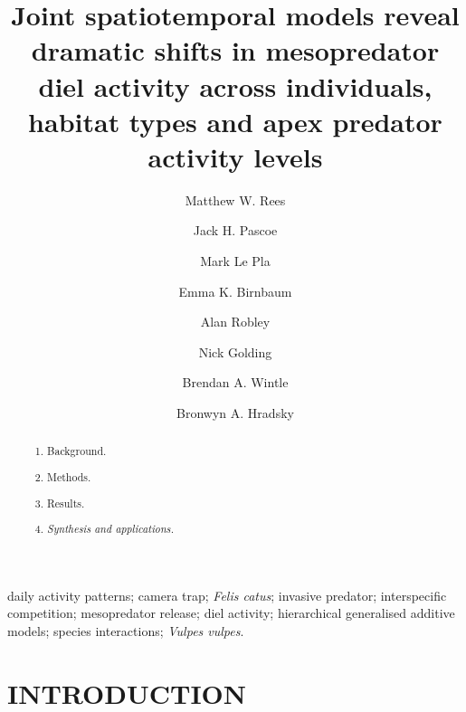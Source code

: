 \documentclass[]{elsarticle} %
\begin{document}
\begin{frontmatter}

  \title{Joint spatiotemporal models reveal dramatic shifts in mesopredator diel activity across individuals, habitat types and apex predator activity levels}
    \author[UOM]{Matthew W. Rees}
    \author[CEC]{Jack H. Pascoe}
  
    \author[CEC]{Mark Le Pla}
  
    \author[CEC]{Emma K. Birnbaum}
  
    \author[ARI]{Alan Robley}
  
    \author[CU,TKI]{Nick Golding}
  
    \author[UOM]{Brendan A. Wintle}
  
    \author[UOM]{Bronwyn A. Hradsky}
  
      \address[UOM]{Quantitative \& Applied Ecology Group, School of Ecosystem and Forest Science, The University of Melbourne, Parkville, VIC, Australia}
    \address[CEC]{Conservation Ecology Centre, Otway Lighthouse Rd, Cape Otway, VIC, Australia}
    \address[ARI]{Department of Environment, Land, Water and Planning, Arthur Rylah Institute for Environmental Research, Heidelberg, Australia}
    \address[CU]{Curtin University, Bentley, WA, Australia}
    \address[TKI]{Telethon Kids Institute, Perth Children's Hospital, Nedlands, WA, Australia}
  
  \begin{abstract}
  \begin{enumerate}
  \def\labelenumi{\arabic{enumi}.}
  \item
    Background.
  \item
    Methods.
  \item
    Results.
  \item
    \emph{Synthesis and applications.}
  \end{enumerate}
  \end{abstract}
   \begin{keyword} daily activity patterns; camera trap; \emph{Felis catus}; invasive predator; interspecific competition; mesopredator release; diel activity; hierarchical generalised additive models; species interactions; \emph{Vulpes vulpes}.\end{keyword}
 \end{frontmatter}

\parskip=12pt

\newpage

\hypertarget{introduction}{%
\section{INTRODUCTION}\label{introduction}}
\end{document}
